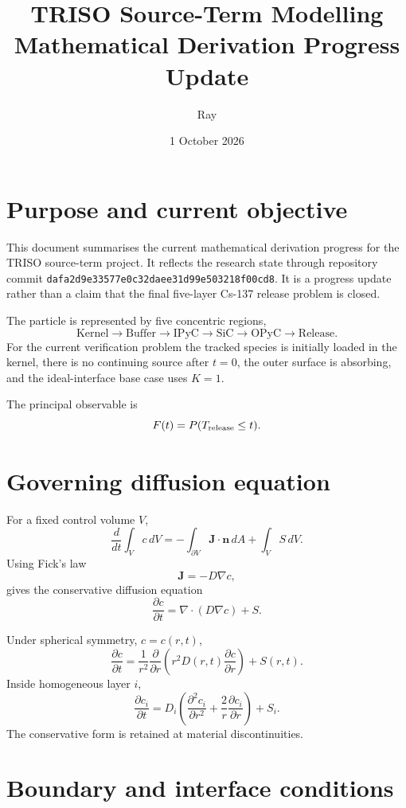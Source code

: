 \documentclass[11pt]{article}
\title{TRISO Source-Term Modelling\\Mathematical Derivation Progress Update}
\author{Ray}
\date{1 October 2026}
\begin{document}
\maketitle

\section{Purpose and current objective}

This document summarises the current mathematical derivation progress for the TRISO source-term project. It reflects the research state through repository commit
\texttt{dafa2d9e33577e0c32daee31d99e503218f00cd8}.
It is a progress update rather than a claim that the final five-layer Cs-137 release problem is closed.

The particle is represented by five concentric regions,
\[
\text{Kernel}\rightarrow\text{Buffer}\rightarrow\text{IPyC}
\rightarrow\text{SiC}\rightarrow\text{OPyC}\rightarrow\text{Release}.
\]
For the current verification problem the tracked species is initially loaded in the kernel, there is no continuing source after $t=0$, the outer surface is absorbing, and the ideal-interface base case uses $K=1$.

The principal observable is
\[
F(t)=P(T_{\rm release}\le t).
\]

\section{Governing diffusion equation}

For a fixed control volume $V$,
\[
\frac{d}{dt}\int_V c\,dV
=
-\int_{\partial V}\mathbf J\cdot\mathbf n\,dA
+\int_V S\,dV.
\]
Using Fick's law
\[
\mathbf J=-D\nabla c,
\]
gives the conservative diffusion equation
\[
\boxed{
\frac{\partial c}{\partial t}
=
\nabla\cdot(D\nabla c)+S
}.
\]

Under spherical symmetry, $c=c(r,t)$,
\[
\boxed{
\frac{\partial c}{\partial t}
=
\frac{1}{r^2}
\frac{\partial}{\partial r}
\left(
r^2D(r,t)\frac{\partial c}{\partial r}
\right)
+S(r,t)
}.
\]
Inside homogeneous layer $i$,
\[
\boxed{
\frac{\partial c_i}{\partial t}
=
D_i\left(
\frac{\partial^2c_i}{\partial r^2}
+
\frac{2}{r}\frac{\partial c_i}{\partial r}
\right)+S_i
}.
\]
The conservative form is retained at material discontinuities.

\section{Boundary and interface conditions}
\end{document}
